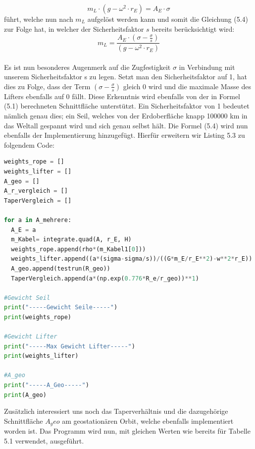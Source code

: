 \documentclass[a4paper, 10pt]{report}
\begin{document}
\begin{equation}
m_L \cdot (g - \omega^2 \cdot r_E) =  A_E \cdot \sigma
\end{equation}
führt, welche nun nach \( m_L \) aufgelöst werden kann und somit die Gleichung (5.4) zur Folge hat, in welcher der Sicherheitsfaktor \( s \) bereits berücksichtigt wird:\\
\begin{equation}
m_L =   \frac{A_E \cdot (\sigma - \frac{\sigma}{s})} {(g - \omega^2 \cdot r_E)}
\end{equation}
\\
Es ist nun besonderes Augenmerk auf die Zugfestigkeit \( \sigma \) in Verbindung mit unserem Sicherheitsfaktor s zu legen. Setzt man den Sicherheitsfaktor auf 1, hat dies zu Folge, dass der Term   \((\sigma - \frac{\sigma}{s})\) gleich 0 wird und die maximale Masse des Lifters ebenfalls auf 0 fällt. Diese Erkenntnis wird ebenfalls von der in Formel (5.1) berechneten Schnittfläche unterstützt. Ein Sicherheitsfaktor von 1 bedeutet nämlich genau dies; ein Seil, welches von der Erdoberfläche knapp 100000 km in das Weltall gespannt wird und sich genau selbst hält.
Die Formel (5.4) wird nun ebenfalls der Implementierung hinzugefügt. Hierfür erweitern wir Listing 5.3 zu folgendem Code:\\
\begin{lstlisting}[language=Python, caption=Hinzufügen der Berechnungen zur Ermittlung des max. Gewichts des Lifters]
weights_rope = []
weights_lifter = []
A_geo = []
A_r_vergleich = []
TaperVergleich = []

for a in A_mehrere:
  A_E = a
  m_Kabel= integrate.quad(A, r_E, H)
  weights_rope.append(rho*(m_Kabel1[0]))
  weights_lifter.append((a*(sigma-sigma/s))/((G*m_E/r_E**2)-w**2*r_E))
  A_geo.append(testrun(R_geo))
  TaperVergleich.append(a*(np.exp(0.776*R_e/r_geo))**1)
  
#Gewicht Seil
print("-----Gewicht Seile-----")
print(weights_rope)

#Gewicht Lifter
print("-----Max Gewicht Lifter-----")
print(weights_lifter)

#A_geo
print("-----A_Geo-----")
print(A_geo)
\end{lstlisting}
Zusätzlich interessiert uns noch das Taperverhältnis und die dazugehörige Schnittfläche \( A_geo \) am geostationären Orbit, welche ebenfalls implementiert worden ist. Das Programm wird nun, mit gleichen Werten wie bereits für Tabelle 5.1 verwendet, ausgeführt. \\
\end{document}
